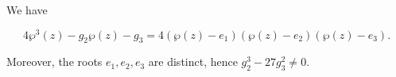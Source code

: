 We have

$$4\wp^3(z) - g_2\wp(z) - g_3 = 4(\wp(z) - e_1)(\wp(z) - e_2)(\wp(z) - e_3).$$

Moreover, the roots $e_1, e_2, e_3$ are distinct, hence $g_2^3 - 27g_3^2 \neq 0$.
